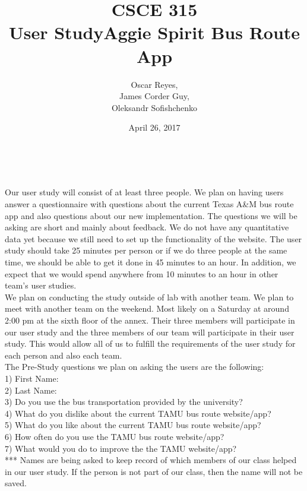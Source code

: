 \documentclass[12pt]{report}
\title{CSCE 315 \\ User Study}
\author{Oscar Reyes,\\
	James Corder Guy,\\
	Oleksandr Sofishchenko}
\date{April 26, 2017}
\begin{document}
	
	\maketitle
	
	\newpage
	
	\begin{center}
		\title{\textbf{Aggie Spirit Bus Route App}} \\
		
	\end{center}

	Our user study will consist of at least three people. We plan on having users answer a questionnaire with questions about the current Texas A\&M bus route app and also questions about our new implementation. The questions we will be asking are short and mainly about feedback. We do not have any quantitative data yet because we still need to set up the functionality of the website. The user study should take 25 minutes per person or if we do three people at the same time, we should be able to get it done in 45 minutes to an hour. In addition, we expect that we would spend anywhere from 10 minutes to an hour in other team's user studies.\\
	
	We plan on conducting the study outside of lab with another team. We plan to meet with another team on the weekend. Most likely on a Saturday at around 2:00 pm at the sixth floor of the annex. Their three members will participate in our user study and the three members of our team will participate in their user study. This would allow all of us to fulfill the requirements of the user study for each person and also each team.\\
	
	The Pre-Study questions we plan on asking the users are the following:\\
	1) First Name:\\
	2) Last Name:\\
	3) Do you use the bus transportation provided by the university?\\
	4) What do you dislike about the current TAMU bus route website/app?\\
	5) What do you like about the current TAMU bus route website/app?\\
	6) How often do you use the TAMU bus route website/app?\\
	7) What would you do to improve the the TAMU website/app?\\
	*** Names are being asked to keep record of which members of our class helped in our user study. If the person is not part of our class, then the name will not be saved.\\
	
\end{document}
